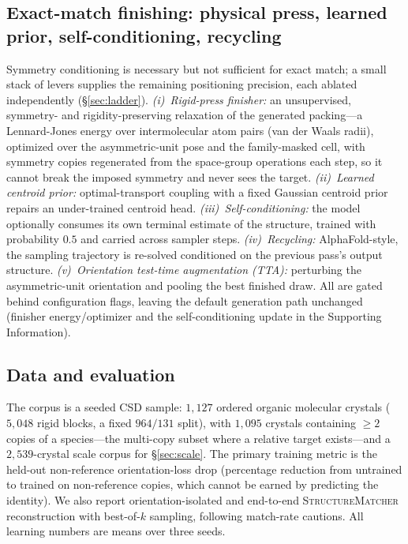 \documentclass[journal=acsodf,manuscript=article]{achemso}
\begin{document}
\subsection{Exact-match finishing: physical press, learned prior, self-conditioning,
recycling}\label{sec:finish}
Symmetry conditioning is necessary but not sufficient for exact match; a small
stack of levers supplies the remaining positioning precision, each ablated
independently (\S\ref{sec:ladder}). \emph{(i)~Rigid-press finisher:} an
unsupervised, symmetry- and rigidity-preserving relaxation of the generated
packing---a Lennard-Jones energy over intermolecular atom pairs (van der Waals
radii), optimized over the asymmetric-unit pose and the family-masked cell, with
symmetry copies regenerated from the space-group operations each step, so it cannot
break the imposed symmetry and never sees the target. \emph{(ii)~Learned centroid
prior:} optimal-transport coupling\cite{pooladian2023multisample} with a fixed
Gaussian centroid prior repairs an under-trained centroid head.
\emph{(iii)~Self-conditioning:} the model optionally consumes its own terminal
estimate of the structure, trained with probability $0.5$ and carried across
sampler steps. \emph{(iv)~Recycling:} AlphaFold-style, the sampling trajectory is
re-solved conditioned on the previous pass's output structure.
\emph{(v)~Orientation test-time augmentation (TTA):} perturbing the
asymmetric-unit orientation and pooling the best finished draw. All are gated
behind configuration flags, leaving the default generation path unchanged (finisher
energy/optimizer and the self-conditioning update in the Supporting Information).

\subsection{Data and evaluation}\label{sec:data}
The corpus is a seeded CSD sample\cite{groom2016csd}: $1{,}127$ ordered organic
molecular crystals ($5{,}048$ rigid blocks, a fixed $964/131$ split), with
$1{,}095$ crystals containing $\ge2$ copies of a species---the multi-copy subset
where a relative target exists---and a $2{,}539$-crystal scale corpus for
\S\ref{sec:scale}. The primary training metric is the held-out non-reference
orientation-loss drop (percentage reduction from untrained to trained on
non-reference copies, which cannot be earned by predicting the identity). We also
report orientation-isolated and end-to-end \textsc{StructureMatcher}
reconstruction\cite{ong2013pymatgen} with best-of-$k$ sampling, following
match-rate cautions\cite{martirossyan2025matching}. All learning numbers are means
over three seeds.
\end{document}
